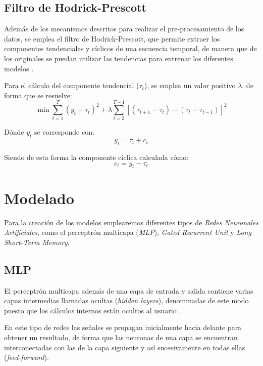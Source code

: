 \subsection{Filtro de Hodrick-Prescott}
Además de los mecanismos descritos para realizar el pre-procesamiento de los datos, se emplea el filtro de Hodrick-Prescott, que 
permite extraer los componentes tendenciales y cíclicos de una secuencia temporal, de manera que de los originales se 
puedan utilizar las tendencias para entrenar los diferentes modelos \cite{misc:wikipediaHP}.

Para el cálculo del componente tendencial (\(\tau_t\)), se emplea un valor positivo \(\lambda\), de forma que se resuelve:
\begin{equation}
    \min \sum_{t=1}^T\left(y_t-\tau_t\right)^2+\lambda \sum_{t=2}^{T-1}\left[\left(\tau_{t+1}-\tau_t\right)-\left(\tau_t-\tau_{t-1}\right)\right]^2
\end{equation}

Dónde \(y_t\) se corresponde con:
\begin{equation}
    y_t = \tau_t + c_t
\end{equation}

Siendo de esta forma la componente cíclica calculada cómo:
\begin{equation}
    c_t = y_t - \tau_t
\end{equation}

\section{Modelado}

Para la creación de los modelos emplearemos diferentes tipos de \textit{Redes Neuronales Artificiales}, como 
el perceptrón multicapa (\textit{MLP}), \textit{Gated Recurrent Unit} y \textit{Long Short-Term Memory}.

\subsection{MLP}
El perceptrón multicapa además de una capa de entrada y salida contiene varias capas intermedias
llamadas ocultas (\textit{hidden layers}), denominadas de este modo puesto que los cálculos
internos están ocultos al usuario \cite{book:aggarwal2018}.

En este tipo de redes las señales se propagan inicialmente hacia delante para obtener un resultado, 
de forma que las neuronas de una capa se encuentran interconectadas con las de la capa
siguiente y así sucesivamente en todas ellas (\textit{feed-forward}).

